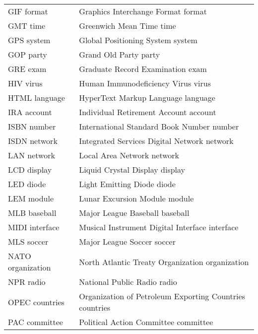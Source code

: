 {\begin{longtable}{@{}ll@{}}
    GIF format&           Graphics Interchange Format format \cite{merriam-webster-gif}\\
    GMT time&             Greenwich Mean Time time \cite{merriam-webster-gmt}\\
    GPS system&           Global Positioning System system \cite{merriam-webster-gps}\\
    GOP party&            Grand Old Party party \cite{merriam-webster-gop}\\
    GRE exam&             Graduate Record Examination exam \cite{merriam-webster-gre}\\
    HIV virus&            Human Immunodeficiency Virus virus \cite{merriam-webster-hiv}\\
    HTML language&        HyperText Markup Language language \cite{merriam-webster-html}\\
    IRA account&          Individual Retirement Account account \cite{merriam-webster-hiv}\\
    ISBN number&          International Standard Book Number number\\
    ISDN network&         Integrated Services Digital Network network\\
    LAN network&          Local Area Network network\\
    LCD display&          Liquid Crystal Display display\\
    LED diode&            Light Emitting Diode diode\\
    LEM module&           Lunar Excursion Module module\\
    MLB baseball&         Major League Baseball baseball \cite{merriam-webster-mlb}\\
    MIDI interface&       Musical Instrument Digital Interface interface\\
    MLS soccer&           Major League Soccer soccer \cite{merriam-webster-mlb}\\
    NATO organization&    North Atlantic Treaty Organization organization\\
    NPR radio&            National Public Radio radio\\    %
    OPEC countries&       Organization of Petroleum Exporting Countries countries\\  %
    PAC committee&        Political Action Committee committee\\       %

\end{longtable}}
